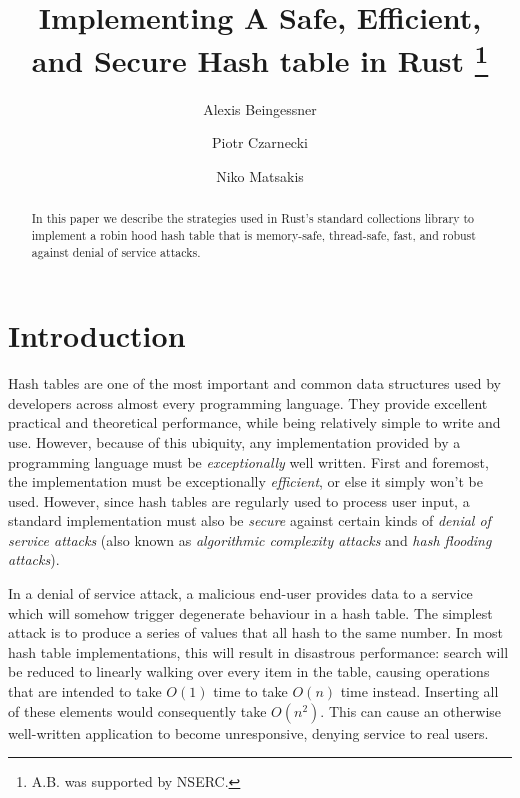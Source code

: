 \documentclass{cccg13}
\title{Implementing A Safe, Efficient, and Secure Hash table in Rust \thanks{A.B. was supported by NSERC.}}
\author{
Alexis Beingessner\footnotemark[2]
\and
Piotr Czarnecki
\and
Niko Matsakis
}
\begin{document}
\thispagestyle{empty}
\maketitle


\begin{abstract}
In this paper we describe the strategies used in Rust's standard collections library to implement a robin hood hash table that is memory-safe, thread-safe, fast, and robust against denial of service attacks.
\end{abstract}







\section{Introduction}   \label{secintro}

Hash tables are one of the most important and common data structures used by
developers across almost every programming language. They provide excellent
practical and theoretical performance, while being relatively simple to write
and use. However, because of this ubiquity, any implementation provided by a
programming language must be \emph{exceptionally} well written. First and
foremost, the implementation must be exceptionally \emph{efficient}, or else
it simply won't be used. However, since hash tables are regularly used to
process user input, a standard implementation must also be \emph{secure}
against certain kinds of \emph{denial of service attacks} (also known as
\emph{algorithmic complexity attacks} and \emph{hash flooding attacks}).

In a denial of service attack, a malicious end-user provides data to a service
which will somehow trigger degenerate behaviour in a hash table. The simplest
attack is to produce a series of values that all hash to the same number. In
most hash table implementations, this will result in disastrous performance:
search will be reduced to linearly walking over every item in the table,
causing operations that are intended to take $O(1)$ time to take $O(n)$ time
instead. Inserting all of these elements would consequently take $O(n^2)$.
This can cause an otherwise well-written application to become unresponsive,
denying service to real users.
\end{document}

